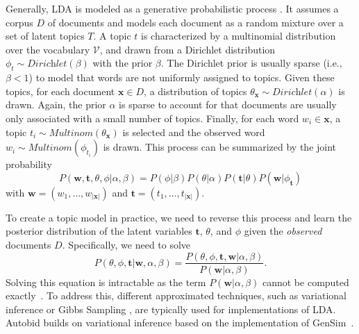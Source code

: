 \documentclass[letterpaper,twocolumn,10pt]{article}
\newcommand{\bow}{\textbf{x}}
\newcommand{\vocabulary}{\mathcal{V}}
\newcommand{\corpus}{D}
\newcommand{\corpusdoc}{\bow}
\newcommand{\corpusdoclen}{\left|\corpusdoc\right|}
\newcommand{\topicwordprior}{\beta}
\newcommand{\topicdocumentprior}{\alpha}
\newcommand{\topic}{t}
\newcommand{\topics}{T}
\newcommand{\topicworddist}{\phi}
\newcommand{\topicdocumentdist}{\theta}
\newcommand{\word}{w}
\newcommand{\prob}{P}
\begin{document}
Generally, \ac{LDA} is modeled as a generative probabilistic process \cite{blei-02-lda, hoffman-10-online, darling-11-theoretical}. It assumes a corpus $\corpus$ of documents and models each document as a random {mixture\EndAccSupp{}} over a set of latent topics $\topics$. A topic $\topic$ is characterized by a {multinomial\EndAccSupp{}} distribution over the vocabulary $\vocabulary$, and drawn from a {Dirichlet\EndAccSupp{}} distribution $\topicworddist_\topic \sim \textit{Dirichlet}(\topicwordprior)$ with the prior $\topicwordprior$. The {Dirichlet\EndAccSupp{}} prior is usually {sparse\EndAccSupp{}} (i.e., $\topicwordprior<1$) to model that words are not uniformly assigned to topics. Given these topics, for each document $\corpusdoc \in \corpus$, a distribution of topics $\topicdocumentdist_\corpusdoc \sim \textit{Dirichlet}(\topicdocumentprior)$ is drawn. Again, the prior $\topicdocumentprior$ is {sparse\EndAccSupp{}} to account for that documents are usually only associated with a small number of topics. Finally, for each word $\word_i \in \corpusdoc$, a topic $\topic_i \sim \textit{Multinom}(\topicdocumentdist_\corpusdoc)$ is selected and the observed word $\word_i \sim \textit{Multinom}(\topicworddist_{\topic_i})$ is drawn. 
This process can be summarized by the joint probability
\begin{equation}
    \prob(\mathbf{\word},\mathbf{\topic},\topicdocumentdist,\topicworddist|\topicdocumentprior, \topicwordprior) = \prob(\topicworddist|\topicwordprior)\prob(\topicdocumentdist|\topicdocumentprior)\prob(\mathbf{\topic}|\topicdocumentdist)\prob(\mathbf{\word}|\topicworddist_{\mathbf{\topic}})
\end{equation}
with $\mathbf{\word} = (\word_1, \dots, \word_{\corpusdoclen}) $ and $\mathbf{\topic} = (\topic_1, \dots, \topic_{\corpusdoclen})$.

To create a topic model in practice, we need to reverse this process and learn the {posterior\EndAccSupp{}} distribution of the latent variables $\mathbf{\topic}$, $\topicdocumentdist$, and $\topicworddist$ given the \emph{observed} documents $\corpus$. Specifically, we need to solve
\begin{equation}
    \prob(\topicdocumentdist, \topicworddist, \mathbf{\topic}|\mathbf{\word}, \topicdocumentprior, \topicwordprior) = \frac{\prob(\topicdocumentdist, \topicworddist, \mathbf{\topic}, \mathbf{\word}|\topicdocumentprior, \topicwordprior)}{\prob(\mathbf{\word}|\topicdocumentprior, \topicwordprior)}.
\end{equation}
Solving this equation is {intractable\EndAccSupp{}} as the  term $\prob(\mathbf{\word}|\topicdocumentprior, \topicwordprior)$ cannot be computed exactly~\cite{blei-02-lda}. To address this, different approximated techniques, such as variational inference \cite{blei-02-lda, hoffman-10-online} or {Gibbs\EndAccSupp{}} Sampling \cite{darling-11-theoretical}, are typically used for implementations of \ac{LDA}. 
Autobid builds on variational inference based on the implementation of GenSim~\cite{rehurek-10-gensim}.
\end{document}
